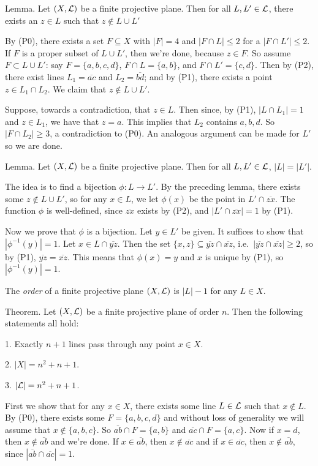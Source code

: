 \proclaim Lemma. Let $(X,{\cal L})$ be a finite projective plane. Then for all $L, L'\in {\cal L}$, there exists an $z\in L$ such that $z\notin L\cup L'$

\proof By (P0), there exists a set $F\subseteq X$ with $|F| = 4$ and $|F\cap L|\leq 2$ for a $|F\cap L'|\leq 2$. If $F$ is a proper subset of $L\cup L'$, then we're done, because $z\in F$. So assume $F\subset L\cup L'$: say $F = \{a, b,c,d\}$, $F\cap L = \{a, b\}$, and $F\cap L' = \{c, d\}$. Then by (P2), there exist lines $L_1 = \overline{ac}$ and $L_2 = \overline{bd}$; and by (P1), there exists a point $z\in L_1\cap L_2$. We claim that $z\notin L\cup L'$.

Suppose, towards a contradiction, that $z\in L$. Then since, by (P1), $|L\cap L_1| = 1$ and $z\in L_1$, we have that $z = a$. This implies that $L_2$ contains $a,b,d$. So $|F\cap L_2| \geq 3$, a contradiction to (P0). An analogous argument can be made for $L'$ so we are done. \slug

\proclaim Lemma. Let $(X,{\cal L})$ be a finite projective plane. Then for all $L,L'\in {\cal L}$, $|L| = |L'|$.

\proof The idea is to find a bijection $\phi : L \rightarrow L'$. By the preceding lemma, there exists some $z\notin L\cup L'$, so for any $x\in L$, we let $\phi(x)$ be the point in $L'\cap \overline{zx}$. The function $\phi$ is well-defined, since $\overline{zx}$ exists by (P2), and $|L' \cap \overline{zx}| = 1$ by (P1).

Now we prove that $\phi$ is a bijection. Let $y\in L'$ be given. It suffices to show that $|\phi^{-1}(y)| = 1$. Let $x\in L\cap \overline{yz}$. Then the set $\{x,z\}\subseteq \overline{yz}\cap\overline{xz}$, i.e.\  $|\overline{yz}\cap\overline{xz}|\geq 2$, so by (P1), $\overline{yz} = \overline{xz}$. This means that $\phi(x) = y$ and $x$ is unique by (P1), so $|\phi^{-1}(y)| = 1$.\slug

The {\it order} of a finite projective plane $(X, {\cal L})$ is $|L| - 1$ for any $L\in X$.

\proclaim Theorem. Let $(X,{\cal L})$ be a finite projective plane of order $n$. Then the following statements all hold:
\medskip
\item {1.} Exactly $n+1$ lines pass through any point $x\in X$.
\smallskip
\item {2.} $|X| = n^2 + n + 1$.
\smallskip
\item {3.} $|{\cal L}| = n^2 + n + 1$.
\medskip

\proof First we show that for any $x\in X$, there exists some line $L\in {\cal L}$ such that $x\notin L$. By (P0), there exists some $F = \{a,b,c,d\}$ and without loss of generality we will assume that $x\notin\{a,b,c\}$. So $\overline{ab} \cap F = \{a,b\}$ and $\overline{ac}\cap F = \{a, c\}$. Now if $x = d$, then $x\notin \overline{ab}$ and we're done. If $x\in \overline{ab}$, then $x\notin\overline{ac}$ and if $x\in \overline{ac}$, then $x\notin\overline{ab}$, since $|\overline{ab} \cap\overline{ac}| = 1$.

